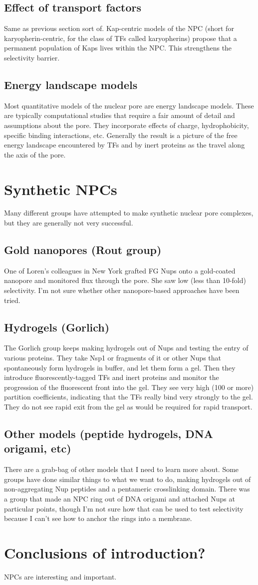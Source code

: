 \subsection{Effect of transport factors}
Same as previous section sort of.  Kap-centric models of the NPC (short for karyopherin-centric, for the class of TFs called karyopherins) propose that a permanent population of Kaps lives within the NPC.  This strengthens the selectivity barrier.
\subsection{Energy landscape models}
Most quantitative models of the nuclear pore are energy landscape models.  These are typically computational studies that require a fair amount of detail and assumptions about the pore.  They incorporate effects of charge, hydrophobicity, specific binding interactions, etc.  Generally the result is a picture of the free energy landscape encountered by TFs and by inert proteins as the travel along the axis of the pore.
\section{Synthetic NPCs}
Many different groups have attempted to make synthetic nuclear pore complexes, but they are generally not very successful.
\subsection{Gold nanopores (Rout group)}
One of Loren's colleagues in New York grafted FG Nups onto a gold-coated nanopore and monitored flux through the pore.  She saw low (less than 10-fold) selectivity.  I'm not sure whether other nanopore-based approaches have been tried.
\subsection{Hydrogels (Gorlich)}
The Gorlich group keeps making hydrogels out of Nups and testing the entry of various proteins.  They take Nsp1 or fragments of it or other Nups that spontaneously form hydrogels in buffer, and let them form a gel.  Then they introduce fluorescently-tagged TFs and inert proteins and monitor the progression of the fluorescent front into the gel.  They see very high (100 or more) partition coefficients, indicating that the TFs really bind very strongly to the gel.  They do not see rapid exit from the gel as would be required for rapid transport.
\subsection{Other models (peptide hydrogels, DNA origami, etc)}
There are a grab-bag of other models that I need to learn more about.  Some groups have done similar things to what we want to do, making hydrogels out of non-aggregating Nup peptides and a pentameric crosslinking domain.  There was a group that made an NPC ring out of DNA origami and attached Nups at particular points, though I'm not sure how that can be used to test selectivity because I can't see how to anchor the rings into a membrane.
\section{Conclusions of introduction?}
NPCs are interesting and important.

